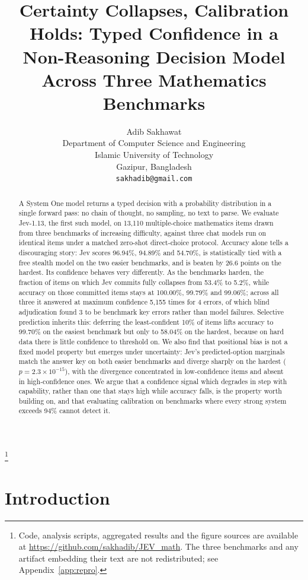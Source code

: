 \documentclass[11pt]{article}
\title{Certainty Collapses, Calibration Holds: Typed Confidence in a\\Non-Reasoning Decision Model Across Three Mathematics Benchmarks}
\author{
  Adib Sakhawat \\
  Department of Computer Science and Engineering \\
  Islamic University of Technology \\
  Gazipur, Bangladesh \\
  \texttt{sakhadib@gmail.com}
}
\newcommand{\blfootnote}[1]{%
  \begingroup
  \renewcommand\thefootnote{}\footnote{#1}%
  \addtocounter{footnote}{-1}%
  \endgroup
}
\begin{document}
\maketitle

\blfootnote{Code, analysis scripts, aggregated results and the figure sources
are available at \url{https://github.com/sakhadib/JEV_math}. The three
benchmarks and any artifact embedding their text are not redistributed; see
Appendix~\ref{app:repro}.}

\begin{abstract}
A System One model returns a typed decision with a probability distribution in a single forward pass: no chain of thought, no sampling, no text to parse. We evaluate Jev-1.13, the first such model, on 13,110 multiple-choice mathematics items drawn from three benchmarks of increasing difficulty, against three chat models run on identical items under a matched zero-shot direct-choice protocol. Accuracy alone tells a discouraging story: Jev scores 96.94\%, 94.89\% and 54.70\%, is statistically tied with a free stealth model on the two easier benchmarks, and is beaten by 26.6 points on the hardest. Its confidence behaves very differently. As the benchmarks harden, the fraction of items on which Jev commits fully collapses from 53.4\% to 5.2\%, while accuracy on those committed items stays at 100.00\%, 99.79\% and 99.06\%; across all three it answered at maximum confidence 5{,}155 times for 4 errors, of which blind adjudication found 3 to be benchmark key errors rather than model failures. Selective prediction inherits this: deferring the least-confident 10\% of items lifts accuracy to 99.70\% on the easiest benchmark but only to 58.04\% on the hardest, because on hard data there is little confidence to threshold on. We also find that positional bias is not a fixed model property but emerges under uncertainty: Jev's predicted-option marginals match the answer key on both easier benchmarks and diverge sharply on the hardest ($p = 2.3\times10^{-15}$), with the divergence concentrated in low-confidence items and absent in high-confidence ones. We argue that a confidence signal which degrades in step with capability, rather than one that stays high while accuracy falls, is the property worth building on, and that evaluating calibration on benchmarks where every strong system exceeds 94\% cannot detect it.
\end{abstract}

\section{Introduction}
\end{document}
